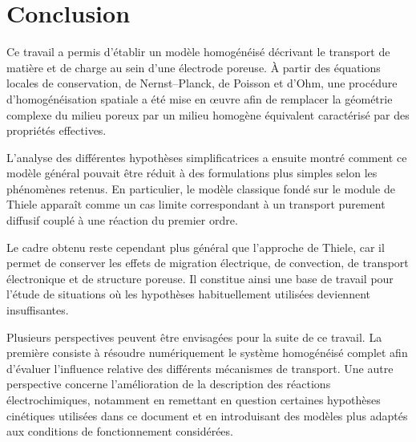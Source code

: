 \section*{Conclusion}

Ce travail a permis d'établir un modèle homogénéisé décrivant le transport de
matière et de charge au sein d'une électrode poreuse. À partir des équations
locales de conservation, de Nernst--Planck, de Poisson et d'Ohm, une procédure
d'homogénéisation spatiale a été mise en œuvre afin de remplacer la géométrie
complexe du milieu poreux par un milieu homogène équivalent caractérisé par des
propriétés effectives.

L'analyse des différentes hypothèses simplificatrices a ensuite montré comment
ce modèle général pouvait être réduit à des formulations plus simples selon les
phénomènes retenus. En particulier, le modèle classique fondé sur le module de
Thiele apparaît comme un cas limite correspondant à un transport purement
diffusif couplé à une réaction du premier ordre.

Le cadre obtenu reste cependant plus général que l'approche de Thiele, car il
permet de conserver les effets de migration électrique, de convection, de
transport électronique et de structure poreuse. Il constitue ainsi une base de
travail pour l'étude de situations où les hypothèses habituellement utilisées
deviennent insuffisantes.

Plusieurs perspectives peuvent être envisagées pour la suite de ce travail. La
première consiste à résoudre numériquement le système homogénéisé complet afin
d'évaluer l'influence relative des différents mécanismes de transport. Une
autre perspective concerne l'amélioration de la description des réactions
électrochimiques, notamment en remettant en question certaines hypothèses
cinétiques utilisées dans ce document et en introduisant des modèles plus
adaptés aux conditions de fonctionnement considérées.